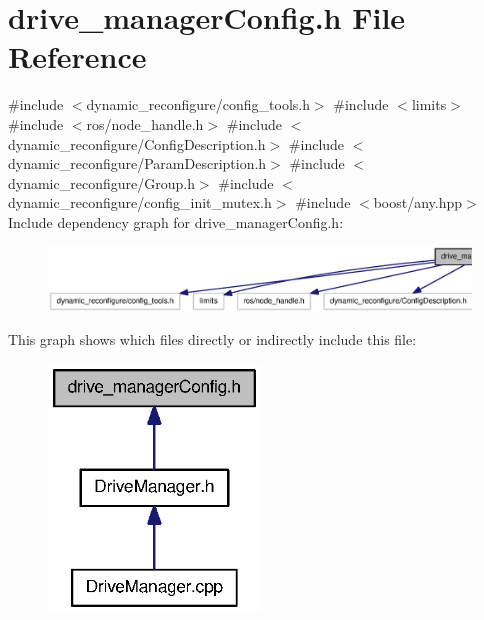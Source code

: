 \section{drive\-\_\-manager\-Config.\-h \-File \-Reference}
\label{drive__managerConfig_8h}
{\ttfamily \#include $<$dynamic\-\_\-reconfigure/config\-\_\-tools.\-h$>$}\*
{\ttfamily \#include $<$limits$>$}\*
{\ttfamily \#include $<$ros/node\-\_\-handle.\-h$>$}\*
{\ttfamily \#include $<$dynamic\-\_\-reconfigure/\-Config\-Description.\-h$>$}\*
{\ttfamily \#include $<$dynamic\-\_\-reconfigure/\-Param\-Description.\-h$>$}\*
{\ttfamily \#include $<$dynamic\-\_\-reconfigure/\-Group.\-h$>$}\*
{\ttfamily \#include $<$dynamic\-\_\-reconfigure/config\-\_\-init\-\_\-mutex.\-h$>$}\*
{\ttfamily \#include $<$boost/any.\-hpp$>$}\*
\-Include dependency graph for drive\-\_\-manager\-Config.\-h\-:
\nopagebreak
\begin{figure}[H]
\begin{center}
\leavevmode
\includegraphics[width=350pt]{drive__managerConfig_8h__incl}
\end{center}
\end{figure}
\-This graph shows which files directly or indirectly include this file\-:
\nopagebreak
\begin{figure}[H]
\begin{center}
\leavevmode
\includegraphics[width=160pt]{drive__managerConfig_8h__dep__incl}
\end{center}
\end{figure}
